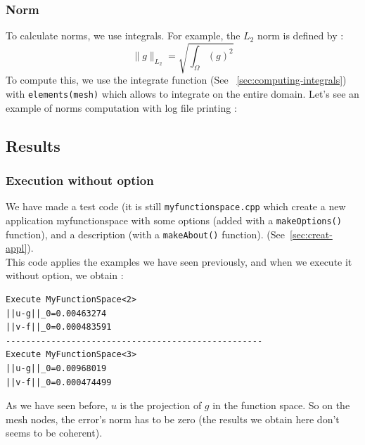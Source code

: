 \subsubsection{Norm}

To calculate norms, we use integrals. For example, the $L_2$ norm is defined by :
$$\displaystyle{\| g\|_{L_2} = \sqrt{\int_\varOmega (g)^2}}$$
To compute this, we use the integrate function (See ~\ref{sec:computing-integrals}) with \lstinline!elements(mesh)! which allows to integrate on the entire domain.
Let's see an example of norms computation with log file printing :



\subsection{Results}

\subsubsection{Execution without option}

We have made a test code (it is still \verb|myfunctionspace.cpp| which create a new application myfunctionspace with some options (added with a \lstinline!makeOptions()! function),
and a description (with a \lstinline!makeAbout()! function). (See~\ref{sec:creat-appl}). \\

This code applies the examples we have seen previously, and when we execute it without option, we obtain :

\begin{lstlisting}
Execute MyFunctionSpace<2>
||u-g||_0=0.00463274
||v-f||_0=0.000483591
---------------------------------------------------
Execute MyFunctionSpace<3>
||u-g||_0=0.00968019
||v-f||_0=0.000474499
\end{lstlisting}
As we have seen before, $u$ is the projection of $g$ in the function space. So on the mesh nodes, the error's norm has to be
zero (the results we obtain here don't seems to be coherent).





